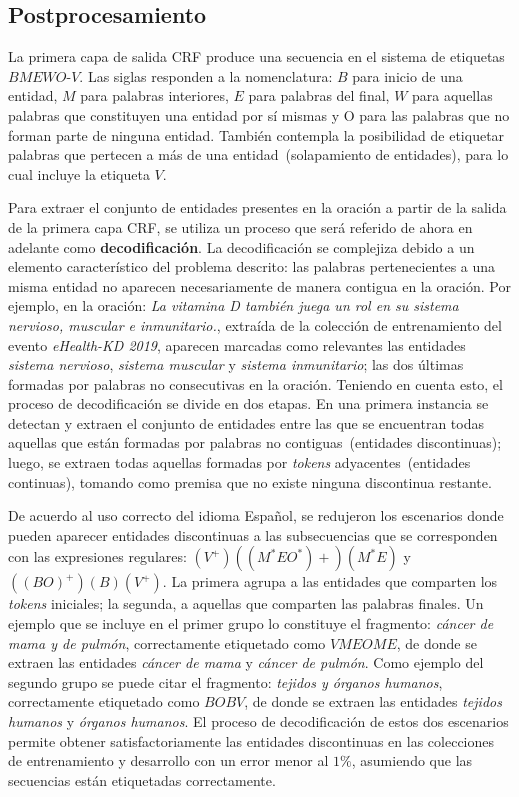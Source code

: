 \subsection{Postprocesamiento}
La primera capa de salida CRF produce una secuencia en el sistema de etiquetas $BMEWO$-$V$.
Las siglas responden a la nomenclatura: $B$ para inicio de una entidad, $M$ para palabras interiores, $E$ para palabras del final, $W$ para aquellas palabras que constituyen una entidad por sí mismas y O para las palabras que no forman parte de ninguna entidad.
También contempla la posibilidad de etiquetar palabras que pertecen a más de una entidad~(solapamiento de entidades), para lo cual incluye la etiqueta $V$.

Para extraer el conjunto de entidades presentes en la oración a partir de la salida de la primera capa CRF, se utiliza un proceso que será referido de ahora en adelante como \textbf{decodificación}.
La decodificación se complejiza debido a un elemento característico del problema descrito: las palabras pertenecientes a una misma entidad no aparecen necesariamente de manera contigua en la oración.
Por ejemplo, en la oración: \textit{La vitamina D también juega un rol en su sistema nervioso, muscular e inmunitario.}, extraída de la colección de entrenamiento del evento \textit{eHealth-KD 2019}, aparecen marcadas como relevantes las entidades \textit{sistema nervioso}, \textit{sistema muscular} y \textit{sistema inmunitario}; las dos últimas formadas por palabras no consecutivas en la oración.
Teniendo en cuenta esto, el proceso de decodificación se divide en dos etapas.
En una primera instancia se detectan y extraen el conjunto de entidades entre las que se encuentran todas aquellas que están formadas por palabras no contiguas~(entidades discontinuas); luego, se extraen todas aquellas formadas por \textit{tokens} adyacentes~(entidades continuas), tomando como premisa que no existe ninguna discontinua restante.

De acuerdo al uso correcto del idioma Español, se redujeron los escenarios donde pueden aparecer entidades discontinuas a las subsecuencias que se corresponden con las expresiones regulares: $(V^+)((M^*EO^*)+)(M^*E)$ y $((BO)^+)(B)(V^+)$.
La primera agrupa a las entidades que comparten los \textit{tokens} iniciales; la segunda, a aquellas que comparten las palabras finales.
Un ejemplo que se incluye en el primer grupo lo constituye el fragmento: \textit{cáncer de mama y de pulmón}, correctamente etiquetado como $VMEOME$, de donde se extraen las entidades \textit{cáncer de mama} y \textit{cáncer de pulmón}.
Como ejemplo del segundo grupo se puede citar el fragmento: \textit{tejidos y órganos humanos}, correctamente etiquetado como $BOBV$, de donde se extraen las entidades \textit{tejidos humanos} y \textit{órganos humanos}.
El proceso de decodificación de estos dos escenarios permite obtener satisfactoriamente las entidades discontinuas en las colecciones de entrenamiento y desarrollo con un error menor al $1\%$, asumiendo que las secuencias están etiquetadas correctamente.


